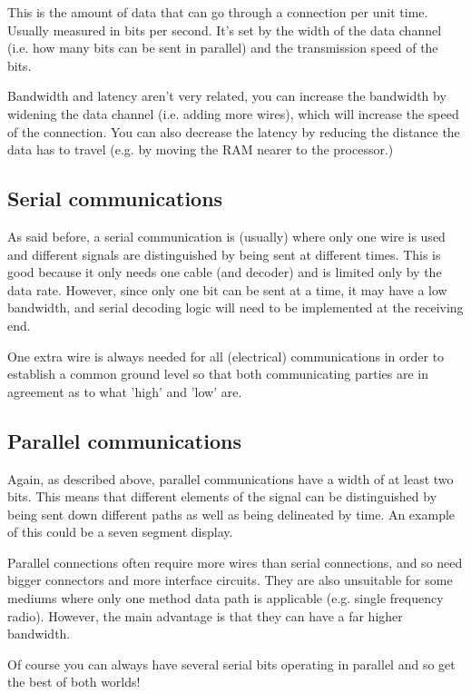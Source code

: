 This is the amount of data that can go through a connection per unit time.
Usually measured in bits per second. It's set by the width of the data channel
(i.e. how many bits can be sent in parallel) and the transmission speed of the
bits.

Bandwidth and latency aren't very related, you can increase the bandwidth by
widening the data channel (i.e. adding more wires), which will increase the
speed of the connection. You can also decrease the latency by reducing the
distance the data has to travel (e.g. by moving the RAM nearer to the
processor.)

\subsection{Serial communications}

As said before, a serial communication is (usually) where only one wire is used
and different signals are distinguished by being sent at different times. This
is good because it only needs one cable (and decoder) and is limited only by the
data rate. However, since only one bit can be sent at a time, it may have a low
bandwidth, and serial decoding logic will need to be implemented at the
receiving end.

One extra wire is always needed for all (electrical) communications in order to
establish a common ground level so that both communicating parties are in
agreement as to what 'high' and 'low' are.

\subsection{Parallel communications}

Again, as described above, parallel communications have a width of at least two
bits. This means that different elements of the signal can be distinguished by
being sent down different paths as well as being delineated by time. An example
of this could be a seven segment display.

Parallel connections often require more wires than serial connections, and so
need bigger connectors and more interface circuits. They are also unsuitable for
some mediums where only one method data path is applicable (e.g. single
frequency radio). However, the main advantage is that they can have a far higher
bandwidth.

Of course you can always have several serial bits operating in parallel and so
get the best of both worlds!

